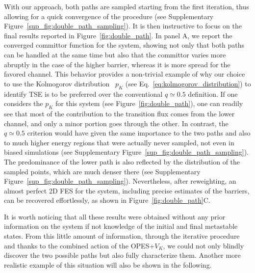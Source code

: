      With our approach, both paths are sampled starting from the first iteration, thus allowing for a quick convergence of the procedure (see Supplementary Figure~\ref{sup_fig:double_path_sampling}).
     It is then instructive to focus on the final results reported in Figure~\ref{fig:double_path}.
     In panel A, we report the converged committor function for the system, showing not only that both paths can be handled at the same time but also that the committor varies more abruptly in the case of the higher barrier, whereas it is more spread for the favored channel.
     This behavior provides a non-trivial example of why our choice to use the Kolmogorov distribution~\cite{kang2024computing} $p_K$ (see Eq.~\ref{eq:kolmogorov_distribution}) to identify TSE is to be preferred over the conventional $q\simeq0.5$ definition.
     If one considers the $p_K$ for this system (see Figure~\ref{fig:double_path}), one can readily see that most of the contribution to the transition flux comes from the lower channel, and only a minor portion goes through the other. 
     In contrast, the $q\simeq0.5$ criterion would have given the same importance to the two paths and also to much higher energy regions that were actually never sampled, not even in biased simulations (see Supplementary Figure~\ref{sup_fig:double_path_sampling}).
     The predominance of the lower path is also reflected by the distribution of the sampled points, which are much denser there (see Supplementary Figure~\ref{sup_fig:double_path_sampling}).
     Nevertheless,  after reweighting, an almost perfect 2D FES for the system, including precise estimates of the barriers, can be recovered effortlessly, as shown in Figure~\ref{fig:double_path}C.

     It is worth noticing that all these results were obtained without any prior information on the system if not knowledge of the initial and final metastable states.
     From this little amount of information, through the iterative procedure and thanks to the combined action of the OPES+$V_K$, we could not only blindly discover the two possible paths but also fully characterize them.
     Another more realistic example of this situation will also be shown in the following.
     

